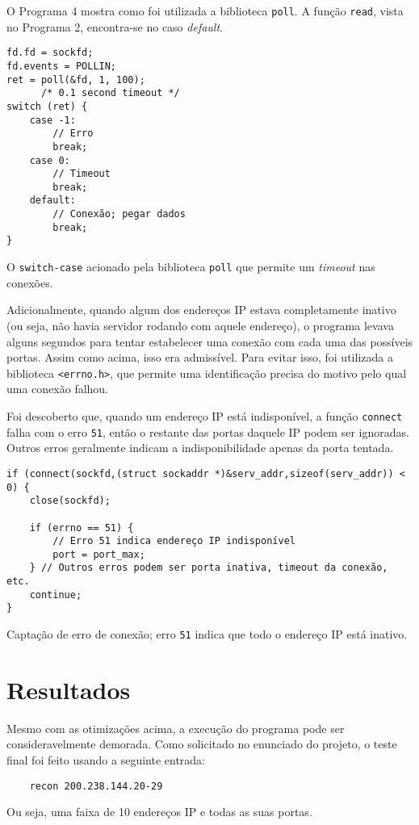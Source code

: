 \documentclass{sig-alternate-05-2015}
\begin{document}
O Programa 4 mostra como foi utilizada a biblioteca \texttt{poll}.
A função \texttt{read}, vista no Programa 2, encontra-se no caso \textit{default}.

\begin{program}
\begin{lstlisting}
fd.fd = sockfd;
fd.events = POLLIN;
ret = poll(&fd, 1, 100);
      /* 0.1 second timeout */
switch (ret) {
    case -1:
        // Erro
        break;
    case 0:
        // Timeout 
        break;
    default:
        // Conexão; pegar dados
        break;
}
\end{lstlisting}
\caption{O \texttt{switch-case} acionado pela biblioteca \texttt{poll} que permite um \textit{timeout} nas conexões.}
\end{program}

Adicionalmente, quando algum dos endereços IP estava completamente inativo (ou seja, não havia servidor rodando com aquele endereço), o programa levava alguns segundos para tentar estabelecer uma conexão com cada uma das possíveis portas.
Assim como acima, isso era admissível.
Para evitar isso, foi utilizada a biblioteca \texttt{<errno.h>}, que permite uma identificação precisa do motivo pelo qual uma conexão falhou.

Foi descoberto que, quando um endereço IP está indisponível, a função \texttt{connect} falha com o erro \texttt{51}, então o restante das portas daquele IP podem ser ignoradas.
Outros erros geralmente indicam a indisponibilidade apenas da porta tentada.

\begin{program}
\begin{lstlisting}
if (connect(sockfd,(struct sockaddr *)&serv_addr,sizeof(serv_addr)) < 0) {
    close(sockfd);

    if (errno == 51) { 
        // Erro 51 indica endereço IP indisponível
        port = port_max;
    } // Outros erros podem ser porta inativa, timeout da conexão, etc.
    continue;   
}
\end{lstlisting}
\caption{Captação de erro de conexão; erro \texttt{51} indica que todo o endereço IP está inativo.}
\end{program}

\section{Resultados}
Mesmo com as otimizações acima, a execução do programa pode ser consideravelmente demorada.
Como solicitado no enunciado do projeto, o teste final foi feito usando a seguinte entrada:
\begin{verbatim}
	recon 200.238.144.20-29
\end{verbatim}
Ou seja, uma faixa de 10 endereços IP e todas as suas portas.
\end{document}
